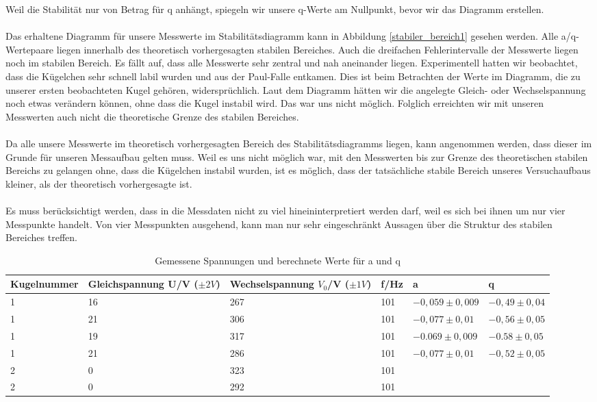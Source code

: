 \documentclass[10pt,a4paper]{article}
\begin{document}
Weil die Stabilität nur von Betrag für q anhängt, spiegeln wir unsere q-Werte am Nullpunkt, bevor wir das Diagramm erstellen. \\\\Das erhaltene Diagramm für unsere Messwerte im Stabilitätsdiagramm kann in Abbildung \ref{stabiler_bereich1} gesehen werden. Alle a/q-Wertepaare liegen innerhalb des theoretisch vorhergesagten stabilen Bereiches. Auch die dreifachen Fehlerintervalle der Messwerte liegen noch im stabilen Bereich. Es fällt auf, dass alle Messwerte sehr zentral und nah aneinander liegen. Experimentell hatten wir beobachtet, dass die Kügelchen sehr schnell labil wurden und aus der Paul-Falle entkamen. Dies ist beim Betrachten der Werte im Diagramm, die zu unserer ersten beobachteten Kugel gehören, widersprüchlich. Laut dem Diagramm hätten wir die angelegte Gleich- oder Wechselspannung noch etwas verändern können, ohne dass die Kugel instabil wird. Das war uns nicht möglich. Folglich erreichten wir mit unseren Messwerten auch nicht die theoretische Grenze des stabilen Bereiches.\\\\Da alle unsere Messwerte im theoretisch vorhergesagten Bereich des Stabilitätsdiagramms liegen, kann angenommen werden, dass dieser im Grunde für unseren Messaufbau gelten muss. Weil es uns nicht möglich war, mit den Messwerten bis zur Grenze des theoretischen stabilen Bereichs zu gelangen ohne, dass die Kügelchen instabil wurden, ist es möglich, dass der tatsächliche stabile Bereich unseres Versuchaufbaus kleiner, als der theoretisch vorhergesagte ist. \\\\Es muss berücksichtigt werden, dass in die Messdaten nicht zu viel hineininterpretiert werden darf, weil es sich bei ihnen um nur vier Messpunkte handelt. Von vier Messpunkten ausgehend, kann man nur sehr eingeschränkt Aussagen über die Struktur des stabilen Bereiches treffen. 

\begin{table}[h!]
	\centering
	\begin{tabular}{|l|l|l|l|l|l|}\hline
		Kugelnummer & Gleichspannung U/V ($\pm 2V$) & Wechselspannung $V_0$/V ($\pm 1V$)& f/Hz & a & q\\\hline
		1 & 16 & 267 & 101 & $-0,059 \pm 0,009$ & $-0,49 \pm 0,04$\\
		1 & 21 & 306 & 101 & $-0,077 \pm 0,01$ & $-0,56 \pm 0,05$\\
		1 & 19 & 317 & 101 & $-0.069 \pm 0,009$ & $-0.58 \pm 0,05$\\
		1 & 21 & 286 & 101 & $-0,077 \pm 0,01$ & $-0,52 \pm 0,05$\\
		2 & 0 & 323 & 101 &&\\
		2 & 0 & 292 & 101 &&\\\hline
	\end{tabular}
	\caption{Gemessene Spannungen und berechnete Werte für a und q}
	\label{gefangen2}
\end{table}
\end{document}
